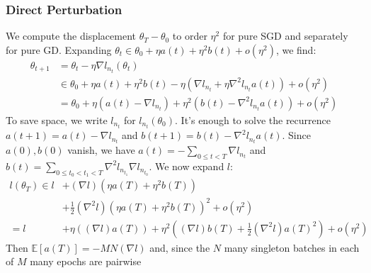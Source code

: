 \documentclass{article}
\newcommand{\expct}[1]{\mathbb{E}\left[#1\right]}
\begin{document}
        \subsubsection*{Direct Perturbation} 
            We compute the displacement $\theta_T-\theta_0$ to order $\eta^2$ 
            for pure SGD and separately for pure GD.  Expanding
            $
                \theta_t \in \theta_0 + \eta a(t) + \eta^2 b(t) + o(\eta^2)
            $, we find:
            \begin{align*}
                \theta_{t+1} &=     \theta_t - \eta \nabla l_{n_t} (\theta_t) \\
                             &\in       \theta_0
                                    +   \eta a(t) + \eta^2 b(t)
                                    -   \eta (
                                                \nabla l_{n_t}
                                            +   \eta \nabla^2 l_{n_t} a(t) 
                                        )
                                    +   o(\eta^2) \\
                             &=     \theta_0
                                +   \eta (a(t) - \nabla l_{n_t})
                                +   \eta^2 (b(t) - \nabla^2 l_{n_t} a(t)) 
                                +   o(\eta^2)
            \end{align*}
            To save space, we write $l_{n_t}$ for $l_{n_t}(\theta_0)$.  It's
            enough to solve the recurrence $a(t+1) = a(t) - \nabla l_{n_t}$ and
            $b(t+1) = b(t) - \nabla^2 l_{n_t} a(t)$.  Since $a(0), b(0)$
            vanish, we have $a(t) =-\sum_{0\leq t<T} \nabla l_{n_t}$ and $b(t)
            = \sum_{0\leq t_0 < t_1 < T} \nabla^2 l_{n_{t_1}} \nabla
            l_{n_{t_0}}$.  We now expand $l$:
            \begin{align*}
                l(\theta_T) \in    l   &+   (\nabla l) (\eta a(T) + \eta^2 b(T)) \\
                                       &+   \frac{1}{2} (\nabla^2 l) (\eta a(T) + \eta^2 b(T))^2
                                        +   o(\eta^2) \\
                            =      l   &+   \eta ((\nabla l) a(T))
                                        +   \eta^2 ((\nabla l) b(T) + \frac{1}{2} (\nabla^2 l) a(T)^2 )
                                        +   o(\eta^2)
            \end{align*}
            Then $\expct{a(T)} = -MN(\nabla l)$ and, since the $N$ many
            singleton batches in each of $M$ many epochs are pairwise
\end{document}
